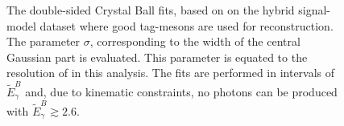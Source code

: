 \begin{figure}[htbp!]
{    }

    \caption{\label{fig:resolution_fits} The double-sided Crystal Ball fits, based on 
    on the hybrid signal-model dataset where good tag-\B mesons are used for \EB reconstruction.
    The parameter $\sigma$, corresponding to the width of the central Gaussian part is evaluated.
    This parameter is equated to the resolution of \EB in this analysis.
    The fits are performed in intervals of $\tilde{E}_{\gamma}^B$ and, due to kinematic constraints,
    no \BtoXsgamma photons can be produced with $\tilde{E}_{\gamma}^B\gtrsim 2.6$.
    }
\end{figure}

